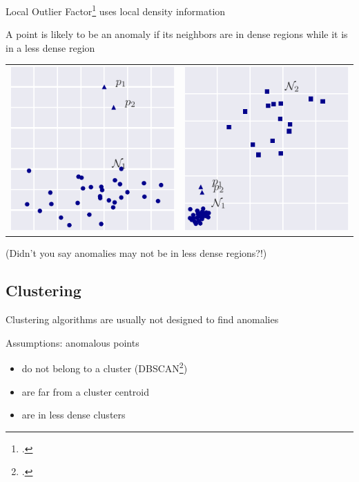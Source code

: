 \documentclass{beamer}
\begin{document}
  \begin{frame}{Local Outlier Factor\footcite{Breunig1999} uses local density information}
    
    A point is likely to be an anomaly if its neighbors are in dense regions while it is in a less dense region
    \centering
    \begin{tabular}{c|c}
    \includegraphics[width=.45\textwidth]{figs/hard1_dist.pdf} &
    \includegraphics[width=.45\textwidth]{figs/hard2_dist.pdf}
    \end{tabular}
    (Didn't you say anomalies may not be in less dense regions?!)
    
  \end{frame}


  \subsection{Clustering}

  \begin{frame}{Clustering algorithms are usually not designed to find anomalies}

    Assumptions: anomalous points
    \begin{itemize}
    \item do not belong to a cluster (DBSCAN\footcite{Ester1996})
    \item are far from a cluster centroid %
    \item are in less dense clusters
    \end{itemize}

  \end{frame}
\end{document}
